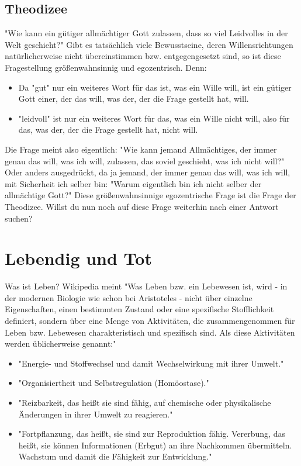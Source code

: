 \documentclass[12pt]{book}
\begin{document}
\subsection{Theodizee}

"Wie kann ein gütiger allmächtiger Gott zulassen, dass so viel Leidvolles in der Welt geschieht?" Gibt es tatsächlich viele Bewusstseine, deren Willensrichtungen natürlicherweise nicht übereinstimmen bzw. entgegengesetzt sind, so ist diese Fragestellung größenwahnsinnig und egozentrisch. Denn:
\begin{itemize}
\item Da "gut" nur ein weiteres Wort für das ist, was ein Wille will, ist ein gütiger Gott einer, der das will, was der, der die Frage gestellt hat, will.
\item "leidvoll" ist nur ein weiteres Wort für das, was ein Wille nicht will, also für das, was der, der die Frage gestellt hat, nicht will.
\end{itemize}

Die Frage meint also eigentlich: "Wie kann jemand Allmächtiges, der immer genau das will, was ich will, zulassen, das soviel geschieht, was ich nicht will?" Oder anders ausgedrückt, da ja jemand, der immer genau das will, was ich will, mit Sicherheit ich selber bin: "Warum eigentlich bin ich nicht selber der allmächtige Gott?" Diese größenwahnsinnige egozentrische Frage ist die Frage der Theodizee. Willst du nun noch auf diese Frage weiterhin nach einer Antwort suchen?

\section{Lebendig und Tot}

Was ist Leben? Wikipedia meint
"Was Leben bzw. ein Lebewesen ist, wird - in der modernen Biologie wie schon bei Aristoteles - nicht über einzelne Eigenschaften, einen bestimmten Zustand oder eine spezifische Stofflichkeit definiert, sondern über eine Menge von Aktivitäten, die zusammengenommen für Leben bzw. Lebewesen charakteristisch und spezifisch sind. Als diese Aktivitäten werden üblicherweise genannt:"
\begin{itemize}
\item "Energie- und Stoffwechsel und damit Wechselwirkung mit ihrer Umwelt."
\item "Organisiertheit und Selbstregulation (Homöostase)."
\item "Reizbarkeit, das heißt sie sind fähig, auf chemische oder physikalische Änderungen in ihrer Umwelt zu reagieren."
\item "Fortpflanzung, das heißt, sie sind zur Reproduktion fähig.
Vererbung, das heißt, sie können Informationen (Erbgut) an ihre Nachkommen übermitteln.
Wachstum und damit die Fähigkeit zur Entwicklung."
\end{itemize}
\end{document}
